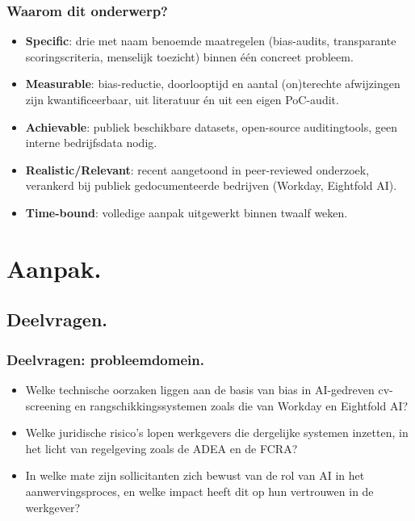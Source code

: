 \documentclass[aspectratio=169]{beamer}
\begin{document}
\begin{frame}
    \frametitle{Waarom dit onderwerp?}

    \small
    \begin{itemize}
        \item \textbf{Specific}: drie met naam benoemde maatregelen
            (bias-audits, transparante scoringscriteria, menselijk
            toezicht) binnen \'e\'en concreet probleem.
        \item \textbf{Measurable}: bias-reductie, doorlooptijd en aantal
            (on)terechte afwijzingen zijn kwantificeerbaar, uit
            literatuur \'en uit een eigen PoC-audit.
        \item \textbf{Achievable}: publiek beschikbare datasets,
            open-source auditingtools, geen interne bedrijfsdata nodig.
        \item \textbf{Realistic/Relevant}: recent aangetoond in
            peer-reviewed onderzoek, verankerd bij publiek
            gedocumenteerde bedrijven (Workday, Eightfold AI).
        \item \textbf{Time-bound}: volledige aanpak uitgewerkt binnen
            twaalf weken.
    \end{itemize}
\end{frame}


\section{Aanpak.}

\subsection{Deelvragen.}

\begin{frame}
    \frametitle{Deelvragen: probleemdomein.}

    \begin{itemize}
        \item Welke technische oorzaken liggen aan de basis van bias in
            AI-gedreven cv-screening en rangschikkingssystemen zoals die
            van Workday en Eightfold AI?
        \item Welke juridische risico's lopen werkgevers die dergelijke
            systemen inzetten, in het licht van regelgeving zoals de
            ADEA en de FCRA?
        \item In welke mate zijn sollicitanten zich bewust van de rol
            van AI in het aanwervingsproces, en welke impact heeft dit
            op hun vertrouwen in de werkgever?
    \end{itemize}
\end{frame}
\end{document}
